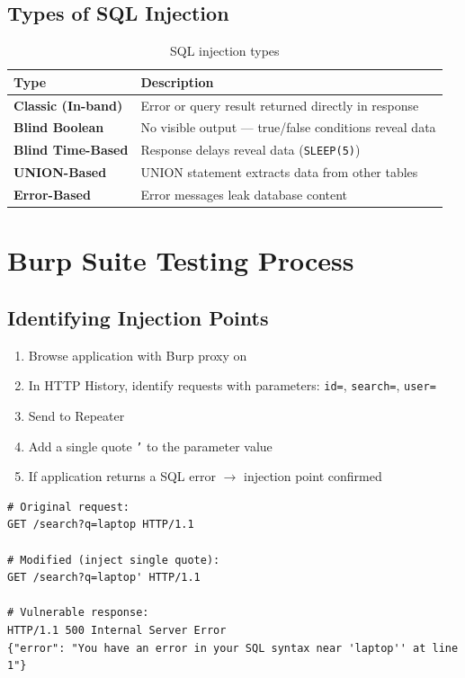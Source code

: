 \subsection{Types of SQL Injection}

\begin{table}[H]
\centering
\caption{SQL injection types}
\begin{tabularx}{\textwidth}{>{\bfseries}lX}
\toprule
Type & Description \\
\midrule
Classic (In-band) & Error or query result returned directly in response \\
Blind Boolean & No visible output — true/false conditions reveal data \\
Blind Time-Based & Response delays reveal data (\texttt{SLEEP(5)}) \\
UNION-Based & UNION statement extracts data from other tables \\
Error-Based & Error messages leak database content \\
\bottomrule
\end{tabularx}
\end{table}

\section{Burp Suite Testing Process}

\subsection{Identifying Injection Points}
\begin{enumerate}
  \item Browse application with Burp proxy on
  \item In HTTP History, identify requests with parameters: \texttt{id=}, \texttt{search=}, \texttt{user=}
  \item Send to Repeater
  \item Add a single quote \texttt{'} to the parameter value
  \item If application returns a SQL error $\to$ injection point confirmed
\end{enumerate}

\begin{lstlisting}[style=http, caption={SQL injection test in Repeater}]
# Original request:
GET /search?q=laptop HTTP/1.1

# Modified (inject single quote):
GET /search?q=laptop' HTTP/1.1

# Vulnerable response:
HTTP/1.1 500 Internal Server Error
{"error": "You have an error in your SQL syntax near 'laptop'' at line 1"}
\end{lstlisting}

